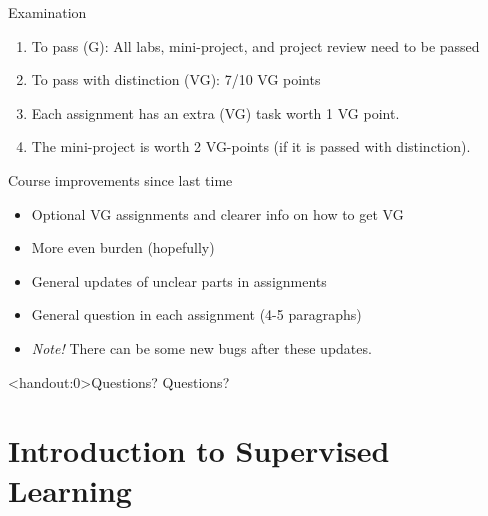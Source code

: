 \documentclass[10pt,handout]{beamer}
\begin{document}
\begin{frame}{Examination}

\begin{enumerate}
\item To pass (G): All labs, mini-project, and project review need to be passed\pause
\item To pass with distinction (VG): 7/10 VG points\pause
\item Each assignment has an extra (VG) task worth 1 VG point.\pause
\item The mini-project is worth 2 VG-points (if it is passed with distinction).
\end{enumerate}

\end{frame}


\begin{frame}{Course improvements since last time}

\begin{itemize}
\item Optional VG assignments and clearer info on how to get VG
\item More even burden (hopefully)
\item General updates of unclear parts in assignments
\item General question in each assignment (4-5 paragraphs)
\item \emph{Note!} There can be some new bugs after these updates.
\end{itemize}

\end{frame}

\begin{frame}<handout:0>{Questions?}
Questions?
\end{frame}


\section{Introduction to Supervised Learning}
\frame{\sectionpage}
\end{document}
